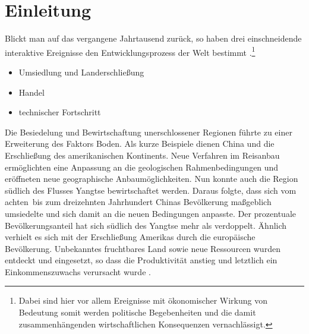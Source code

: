 \chapter{Einleitung}\label{Einleitung}
Blickt man auf das vergangene Jahrtausend zurück, so haben drei einschneidende interaktive Ereignisse den Entwicklungsprozess der Welt bestimmt \citep{Maddison.2001}.\footnote{Dabei sind hier vor allem Ereignisse mit ökonomischer Wirkung von Bedeutung somit werden politische Begebenheiten und die damit zusammenhängenden wirtschaftlichen Konsequenzen vernachlässigt.}

\begin{itemize}
	\item Umsiedlung und Landerschließung
	\item Handel
	\item technischer Fortschritt
\end{itemize}

Die Besiedelung und Bewirtschaftung unerschlossener Regionen führte zu einer Erweiterung des Faktors Boden. Als kurze Beispiele dienen China und die Erschließung des amerikanischen Kontinents.  Neue Verfahren im Reisanbau ermöglichten eine Anpassung an die geologischen Rahmenbedingungen und eröffneten neue geographische Anbaumöglichkeiten. Nun konnte auch die Region südlich des Flusses Yangtse bewirtschaftet werden. Daraus folgte, dass sich vom achten~bis zum dreizehnten Jahrhundert Chinas Bevölkerung maßgeblich umsiedelte und sich damit an die neuen Bedingungen anpasste. Der prozentuale Bevölkerungsanteil hat sich südlich des Yangtse mehr als verdoppelt. Ähnlich verhielt es sich mit der Erschließung Amerikas durch die europäische Bevölkerung. Unbekanntes fruchtbares Land sowie neue Ressourcen wurden entdeckt und eingesetzt, so dass die Produktivität anstieg und letztlich ein Einkommenszuwachs verursacht wurde \citep{Maddison.2001}.\\


